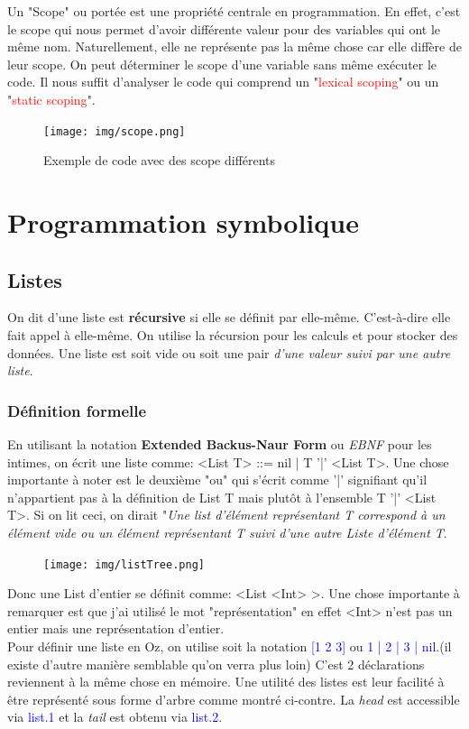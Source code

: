\documentclass{report}
\begin{document}
Un "Scope" ou portée est une propriété centrale en programmation. En effet, c'est le scope qui nous permet d'avoir différente valeur pour des variables qui ont le même nom. Naturellement, elle ne représente pas la même chose car elle diffère de leur scope. On peut déterminer le scope d'une variable sans même exécuter le code. Il nous suffit d'analyser le code qui comprend un "\textcolor{red}{lexical scoping}" ou un "\textcolor{red}{static scoping}".
\begin{figure}[H]
\centering
\texttt{[image: img/scope.png]}
\caption{Exemple de code avec des scope différents}
\end{figure}


\chapter{Programmation symbolique}
\section{Listes}
On dit d'une liste est \textbf{récursive} si elle se définit par elle-même. C'est-à-dire elle fait appel à elle-même. On utilise la récursion pour les calculs et pour stocker des données.
Une liste est soit vide ou soit une pair \textit{d'une valeur suivi par une autre liste}.
\subsection{Définition formelle}
En utilisant la notation \textbf{Extended Backus-Naur Form} ou \textit{EBNF} pour les intimes, on écrit une liste comme: <List T> ::= nil | T '|' <List T>. Une chose importante à noter est le deuxième "ou" qui s'écrit comme '|' signifiant qu'il n'appartient pas à la définition de List T mais plutôt à l'ensemble T '|' <List T>. Si on lit ceci, on dirait "\textit{Une list d'élément représentant T correspond à un élément vide ou un élément représentant T suivi d'une autre Liste d'élément T}.\\

\begin{figure}
	\centering
	\texttt{[image: img/listTree.png]}
\end{figure}
Donc une List d'entier se définit comme: <List <Int> >. Une chose importante à remarquer est que j'ai utilisé le mot "représentation" en effet <Int> n'est pas un entier mais une représentation d'entier.\\

Pour définir une liste en Oz, on utilise soit la notation \textcolor{blue}{[1 2 3]} ou \textcolor{blue}{1 | 2 | 3 | nil}.(il existe d'autre manière semblable qu'on verra plus loin) C'est 2 déclarations reviennent à la même chose en mémoire. Une utilité des listes est leur facilité à être représenté sous forme d'arbre comme montré ci-contre. La \textit{head} est accessible via \textcolor{blue}{list.1} et la \textit{tail} est obtenu via \textcolor{blue}{list.2}.
\end{document}
